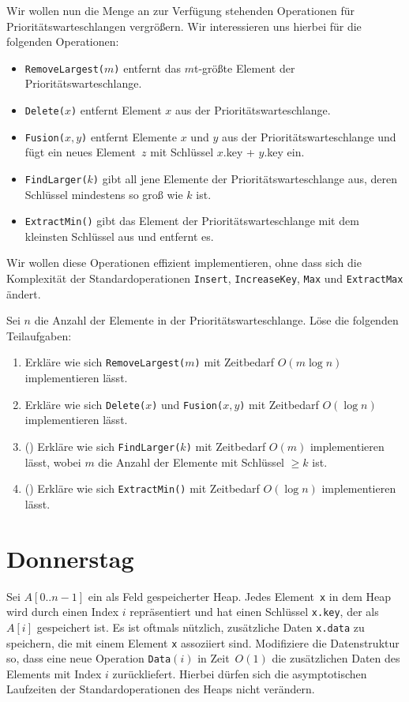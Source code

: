 \documentclass{uebung_cs}
\begin{document}
\begin{aufgabe}
	Wir wollen nun die Menge an zur Verfügung stehenden Operationen für Prioritätswarteschlangen vergrößern.
	Wir interessieren uns hierbei für die folgenden Operationen:
	\begin{itemize}
		\item \texttt{RemoveLargest($m$)} entfernt das $m$t-größte Element der Prioritätswarteschlange.
		\item \texttt{Delete($x$)} entfernt Element $x$ aus der Prioritätswarteschlange.
		\item \texttt{Fusion($x,y$)} entfernt Elemente $x$ und $y$ aus der Prioritätswarteschlange und fügt ein neues Element~$z$ mit Schlüssel $x$.key + $y$.key ein.
		\item \texttt{FindLarger($k$)} gibt all jene Elemente der Prioritätswarteschlange aus, deren Schlüssel mindestens so groß wie $k$ ist.
		\item \texttt{ExtractMin()} gibt das Element der Prioritätswarteschlange mit dem kleinsten Schlüssel aus und entfernt es.
	\end{itemize}
	Wir wollen diese Operationen effizient implementieren, ohne dass sich die Komplexität der Standardoperationen \texttt{Insert}, \texttt{IncreaseKey}, \texttt{Max} und \texttt{ExtractMax} ändert.

	Sei $n$ die Anzahl der Elemente in der Prioritätswarteschlange.
	Löse die folgenden Teilaufgaben:
	\begin{enumerate}
		\item Erkläre wie sich \texttt{RemoveLargest($m$)} mit Zeitbedarf $O(m\log n)$ implementieren lässt.
		\item Erkläre wie sich \texttt{Delete($x$)} und \texttt{Fusion($x,y$)} mit Zeitbedarf $O(\log n)$ implementieren lässt.
		\item (\hard) Erkläre wie sich \texttt{FindLarger($k$)} mit Zeitbedarf $O(m)$ implementieren lässt, wobei $m$ die Anzahl der Elemente mit Schlüssel $\geq k$ ist.
		\item (\hard) Erkläre wie sich \texttt{ExtractMin()} mit Zeitbedarf $O(\log n)$ implementieren lässt.
	\end{enumerate}
\end{aufgabe}

\section*{Donnerstag}
\begin{aufgabe}
	Sei $A[0..n-1]$ ein als Feld gespeicherter Heap.
	Jedes Element~\texttt{x} in dem Heap wird durch einen Index $i$ repräsentiert und hat einen Schlüssel \texttt{x.key}, der als $A[i]$ gespeichert ist.
	Es ist oftmals nützlich, zusätzliche Daten \texttt{x.data} zu speichern, die mit einem Element \texttt{x} assoziiert sind.
	Modifiziere die Datenstruktur so, dass eine neue Operation \texttt{Data$(i)$} in Zeit~$O(1)$ die zusätzlichen Daten des Elements mit Index $i$ zurückliefert. Hierbei dürfen sich die asymptotischen Laufzeiten der Standardoperationen des Heaps nicht verändern.
\end{aufgabe}
\end{document}
